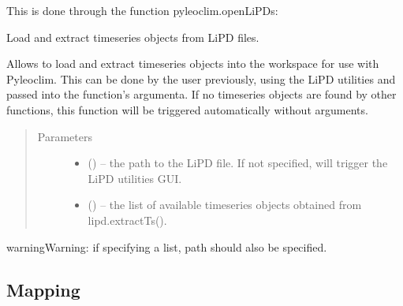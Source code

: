 \documentclass[letterpaper,10pt,english]{sphinxmanual}
\begin{document}
This is done through the function pyleoclim.openLiPDs:

\begin{fulllineitems}
\label{\detokenize{Main:pyleoclim.openLipds}}
Load and extract timeseries objects from LiPD files.

Allows to load and extract timeseries objects into the workspace for use
with Pyleoclim. This can be done by the user previously, using the LiPD
utilities and passed into the function's argumenta. If no timeseries objects
are found by other functions, this function will be triggered automatically
without arguments.
\begin{quote}\begin{description}
\item[{Parameters}] \leavevmode\begin{itemize}
\item {} 
 () -- the path to the LiPD file. If not specified, will
trigger the LiPD utilities GUI.

\item {} 
 () -- the list of available timeseries objects
obtained from lipd.extractTs().

\end{itemize}

\end{description}\end{quote}

\begin{sphinxadmonition}{warning}{Warning:}
if specifying a list, path should also be specified.
\end{sphinxadmonition}

\end{fulllineitems}



\subsection{Mapping}
\label{\detokenize{Main:mapping}}
\end{document}
